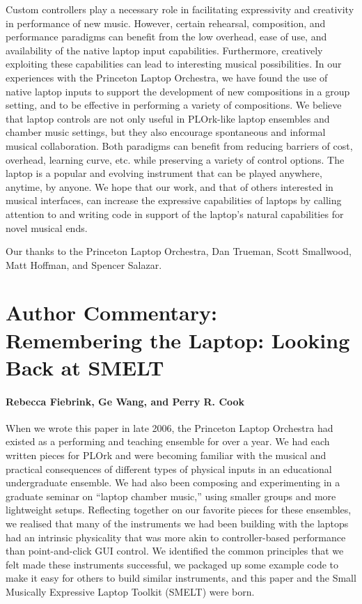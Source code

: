 Custom controllers play a necessary role in facilitating expressivity and
creativity in performance of new music. However, certain rehearsal, composition,
and performance paradigms can benefit from the low overhead, ease of use, and
availability of the native laptop input capabilities. Furthermore, creatively
exploiting these capabilities can lead to interesting musical possibilities. In
our experiences with the Princeton Laptop Orchestra, we have found the use of
native laptop inputs to support the development of new compositions in a group
setting, and to be effective in performing a variety of compositions. We believe
that laptop controls are not only useful in PLOrk-like laptop ensembles and
chamber music settings, but they also encourage spontaneous and informal musical
collaboration. Both paradigms can benefit from reducing barriers of cost,
overhead, learning curve, etc. while preserving a variety of control options. The
laptop is a popular and evolving instrument that can be played anywhere, anytime,
by anyone. We hope that our work, and that of others interested in musical
interfaces, can increase the expressive capabilities of laptops by calling
attention to and writing code in support of the laptop's natural capabilities for
novel musical ends.

\begin{acknowledgement}
Our thanks to the Princeton Laptop Orchestra, Dan Trueman, Scott Smallwood, Matt
Hoffman, and Spencer Salazar.
\end{acknowledgement}

%

\section*{Author Commentary: Remembering the Laptop: Looking Back at SMELT}
\paragraph{Rebecca Fiebrink, Ge Wang, and Perry R. Cook}

When we wrote this paper in late 2006, the Princeton Laptop Orchestra had existed as a performing and teaching ensemble for over a year. We had each written pieces for PLOrk and were becoming familiar with the musical and practical consequences of different types of physical inputs in an educational undergraduate ensemble. We had also been composing and experimenting in a graduate seminar on ``laptop chamber music,'' using smaller groups and more lightweight setups. Reflecting together on our favorite pieces for these ensembles, we realised that many of the instruments we had been building with the laptops had an intrinsic physicality that was more akin to controller-based performance than point-and-click GUI control. We identified the common principles that we felt made these instruments successful, we packaged up some example code to make it easy for others to build similar instruments, and this paper and the Small Musically Expressive Laptop Toolkit (SMELT) were born.

